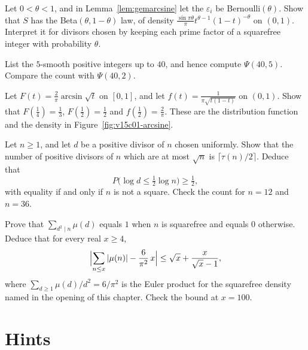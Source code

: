 \begin{exercise}[$\star\star\star$]\label{ex:betalaw}
Let $0<\theta<1$, and in Lemma~\ref{lem:gemarcsine} let the $\varepsilon_i$ be Bernoulli$(\theta)$. Show that $S$ has the Beta$(\theta,1-\theta)$ law, of density $\frac{\sin\pi\theta}\pi t^{\theta-1}(1-t)^{-\theta}$ on $(0,1)$. Interpret it for divisors chosen by keeping each prime factor of a squarefree integer with probability $\theta$.
\end{exercise}

\begin{exercise}[$\star$]\label{ex:v15-01-1}
List the \(5\)-smooth positive integers up to \(40\), and hence compute \(\Psi(40,5)\). Compare the count with \(\Psi(40,2)\).
\end{exercise}

\begin{exercise}[$\star$]\label{ex:v15-01-2}
Let \(F(t)=\frac2\pi\arcsin\sqrt t\) on \([0,1]\), and let \(f(t)=\frac1{\pi\sqrt{t(1-t)}}\) on \((0,1)\). Show that \(F(\tfrac14)=\tfrac13\), \(F(\tfrac12)=\tfrac12\) and \(f(\tfrac12)=\frac2\pi\). These are the distribution function and the density in Figure~\ref{fig:v15c01-arcsine}.
\end{exercise}

\begin{exercise}[$\star\star$]\label{ex:v15-01-3}
Let \(n\ge1\), and let \(d\) be a positive divisor of \(n\) chosen uniformly. Show that the number of positive divisors of \(n\) which are at most \(\sqrt n\) is \(\lceil\tau(n)/2\rceil\). Deduce that
\[
P\bigl(\log d\le\tfrac12\log n\bigr)\ge\tfrac12,
\]
with equality if and only if \(n\) is not a square. Check the count for \(n=12\) and \(n=36\).
\end{exercise}

\begin{exercise}[$\star\star\star$]\label{ex:v15-01-4}
Prove that \(\sum_{d^2\mid n}\mu(d)\) equals \(1\) when \(n\) is squarefree and equals \(0\) otherwise. Deduce that for every real \(x\ge4\),
\[
\Bigl|\sum_{n\le x}|\mu(n)|-\frac6{\pi^2}\,x\Bigr|
\le\sqrt x+\frac{x}{\sqrt x-1},
\]
where \(\sum_{d\ge1}\mu(d)/d^2=6/\pi^2\) is the Euler product for the squarefree density named in the opening of this chapter. Check the bound at \(x=100\).
\end{exercise}

\section{Hints}


